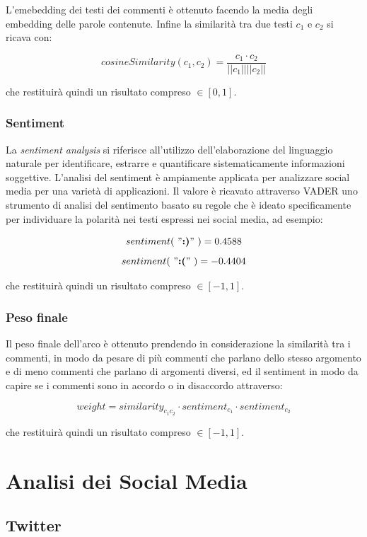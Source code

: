 L'emebedding dei testi dei commenti è ottenuto facendo la media degli embedding delle parole contenute. Infine la similarità tra due testi $c_1$ e $c_2$ si ricava con:

$$cosineSimilarity(c_1, c_2) = \frac{c_1 \cdot c_2}{||c_1|| ||c_2||}$$

che restituirà quindi un risultato compreso $\in [0, 1]$.

\subsubsection{Sentiment}
La \textit{sentiment analysis} si riferisce all'utilizzo dell'elaborazione del linguaggio naturale per identificare, estrarre e quantificare sistematicamente informazioni soggettive. L'analisi del sentiment è ampiamente applicata per analizzare social media per una varietà di applicazioni. Il valore è ricavato attraverso VADER \cite{hutto2014vader} uno strumento di analisi del sentimento basato su regole che è ideato specificamente per individuare la polarità nei testi espressi nei social media, ad esempio:

    $$sentiment(\ "\textbf{:)}" \ ) = 0.4588$$
    $$sentiment(\ "\textbf{:(}" \ ) = -0.4404$$

che restituirà quindi un risultato compreso $\in [-1, 1]$.

\subsubsection{Peso finale}
Il peso finale dell'arco è ottenuto prendendo in considerazione la similarità tra i commenti, in modo da pesare di più commenti che parlano dello stesso argomento e di meno commenti che parlano di argomenti diversi, ed il sentiment in modo da capire se i commenti sono in accordo o in disaccordo attraverso:

$$weight = similarity_{c_1 c_2} \cdot sentiment_{c_1} \cdot sentiment_{c_2}$$

che restituirà quindi un risultato compreso $\in [-1, 1]$.

\section{Analisi dei Social Media}
\label{section:data_sources}

\subsection {Twitter} %

